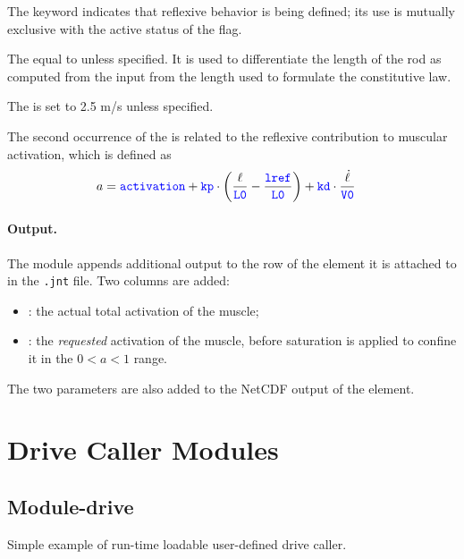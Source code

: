 The  keyword indicates that reflexive behavior is being defined;
its use is mutually exclusive with the active status of the  flag.

The  equal to  unless specified.
It is used to differentiate the length of the rod as computed from the input
from the length used to formulate the constitutive law.

The  is set to 2.5 m/s unless specified.

The second occurrence of the  is related
to the reflexive contribution to muscular activation, which is defined as
\begin{align}
	a
	&=
	\textcolor{blue}{\texttt{activation}}
	+
	\textcolor{blue}{\texttt{kp}} \cdot \left( 
		\frac{\ell}{\textcolor{blue}{\texttt{L0}}}
		-
		\frac{\textcolor{blue}{\texttt{lref}}}{\textcolor{blue}{\texttt{L0}}}
	 \right)
	+
	\textcolor{blue}{\texttt{kd}} \cdot \frac{\dot{\ell}}{\textcolor{blue}{\texttt{V0}}}
\end{align}

\paragraph{Output.}
The module appends additional output to the row of the element it is
attached to in the \texttt{.jnt} file. Two columns are added:
\begin{itemize}
  \item {}: the actual total activation of the muscle;
  \item {}: the \emph{requested} activation of the muscle, before
    saturation is applied to confine it in the $0 < a < 1$ range. 
\end{itemize}
The two parameters are also added to the NetCDF output of the element.

\section{Drive Caller Modules}

\subsection{Module-drive}
Simple example of run-time loadable user-defined drive caller.


